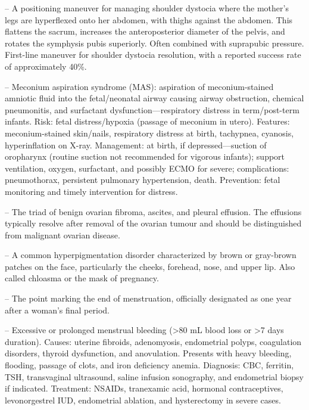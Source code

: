 -- A positioning maneuver for managing shoulder dystocia where the mother’s legs are hyperflexed onto her abdomen, with thighs against the abdomen. This flattens the sacrum, increases the anteroposterior diameter of the pelvis, and rotates the symphysis pubis superiorly. Often combined with suprapubic pressure. First-line maneuver for shoulder dystocia resolution, with a reported success rate of approximately 40\%.

-- Meconium aspiration syndrome (MAS): aspiration of meconium-stained amniotic fluid into the fetal/neonatal airway causing airway obstruction, chemical pneumonitis, and surfactant dysfunction—respiratory distress in term/post-term infants. Risk: fetal distress/hypoxia (passage of meconium in utero). Features: meconium-stained skin/nails, respiratory distress at birth, tachypnea, cyanosis, hyperinflation on X-ray. Management: at birth, if depressed—suction of oropharynx (routine suction not recommended for vigorous infants); support ventilation, oxygen, surfactant, and possibly ECMO for severe; complications: pneumothorax, persistent pulmonary hypertension, death. Prevention: fetal monitoring and timely intervention for distress.

-- The triad of benign ovarian fibroma, ascites, and pleural effusion. The effusions typically resolve after removal of the ovarian tumour and should be distinguished from malignant ovarian disease.

-- A common hyperpigmentation disorder characterized by brown or gray-brown patches on the face, particularly the cheeks, forehead, nose, and upper lip. Also called chloasma or the mask of pregnancy.

-- The point marking the end of menstruation, officially designated as one year after a woman’s final period.

-- Excessive or prolonged menstrual bleeding (>80 mL blood loss or >7 days duration). Causes: uterine fibroids, adenomyosis, endometrial polyps, coagulation disorders, thyroid dysfunction, and anovulation. Presents with heavy bleeding, flooding, passage of clots, and iron deficiency anemia. Diagnosis: CBC, ferritin, TSH, transvaginal ultrasound, saline infusion sonography, and endometrial biopsy if indicated. Treatment: NSAIDs, tranexamic acid, hormonal contraceptives, levonorgestrel IUD, endometrial ablation, and hysterectomy in severe cases.

